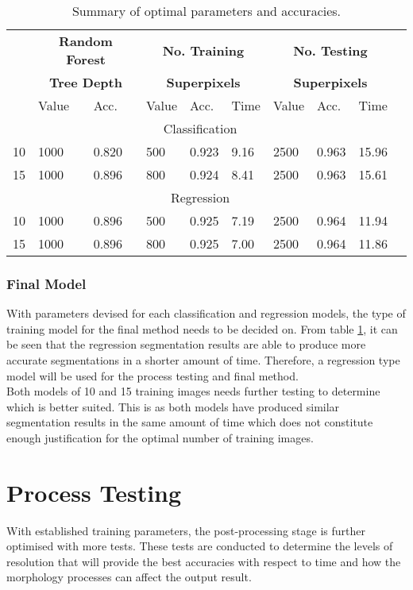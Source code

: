 \begin{table}[H]
\centering
\caption{Summary of optimal parameters and accuracies. }

\begin{tabular}{|l|l|l|l|l|l|l|l|l|l|}
\hline
	& \multicolumn{2}{|c|}{\textbf{Random Forest}} & \multicolumn{3}{|c|}{\textbf{No. Training}} & \multicolumn{3}{|c|}{\textbf{No. Testing}}	\\
	&\multicolumn{2}{|c|}{\textbf{Tree Depth}}& 	\multicolumn{3}{|c|}{\textbf{Superpixels}} & \multicolumn{3}{|c|}{\textbf{Superpixels}}\\
\hline
  & Value & Acc. & Value & Acc. & Time & Value & Acc. & Time \\	
\hline 
\hline
\multicolumn{9}{|c|}{Classification}\\
\hline
10 & 1000 & 0.820 & 500 & 0.923 & 9.16 & 2500 & 0.963 & 15.96\\
15 & 1000 & 0.896 & 800 & 0.924 & 8.41 & 2500 & 0.963 & 15.61 \\
\hline
\hline
\multicolumn{9}{|c|}{Regression}\\
\hline
10 & 1000 & 0.896 & 500 & 0.925 & 7.19 & 2500 & 0.964 & 11.94\\
15 & 1000 & 0.896 & 800 & 0.925 & 7.00 & 2500 & 0.964 & 11.86\\
\hline
		   		
\end{tabular}
\label{table:paramres}
\end{table}

\subsubsection{Final Model}
With parameters devised for each classification and regression models, the type of training model for the final method needs to be decided on. From table \ref{table:paramres}, it can be seen that the regression segmentation results are able to produce more accurate segmentations in a shorter amount of time. Therefore, a regression type model will be used for the process testing and final method. 
\\[1\baselineskip]
Both models of 10 and 15 training images needs further testing to determine which is better suited. This is as both models have produced similar segmentation results in the same amount of time which does not constitute enough justification for the optimal number of training images. 

\section{Process Testing}
\label{sect:processtesting}
With established training parameters, the post-processing stage is further optimised with more tests. These tests are conducted to determine the levels of resolution that will provide the best accuracies with respect to time and how the morphology processes can affect the output result.

